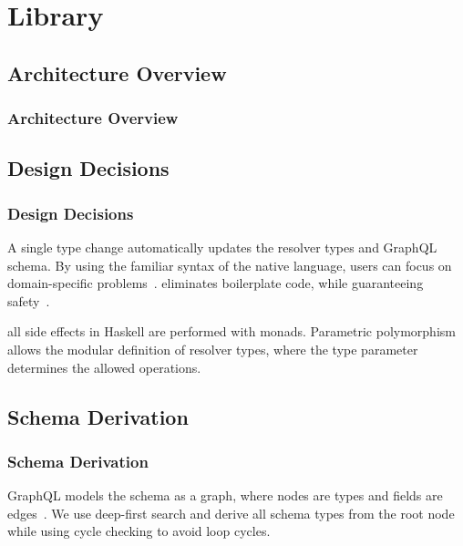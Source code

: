 \section{Library}


\subsection{Architecture Overview}

\begin{frame}\frametitle{Architecture Overview}


\end{frame}

\subsection{Design Decisions} 
\begin{frame}\frametitle{Design Decisions}

\begin{itemize}
     A single type change automatically updates the resolver types and GraphQL schema. 
     By using the familiar syntax of the native language, users can focus on domain-specific problems~\cite{edsl-modeling}.
     eliminates boilerplate code, while guaranteeing safety~\cite{datatype-generic-programming, scrap-your-boilerplate}.
    
     all side effects in Haskell are performed with monads. 
     Parametric polymorphism allows the modular definition of resolver types, where the type parameter determines the allowed operations.
\end{itemize}
\end{frame}

\subsection{Schema Derivation} 
\begin{frame}\frametitle{Schema Derivation}

GraphQL models the schema as a graph, where nodes are types and fields are edges~\cite{migrating-to-gql}. We use deep-first search and derive all schema types from the root node while using cycle checking to avoid loop cycles.

\end{frame}

